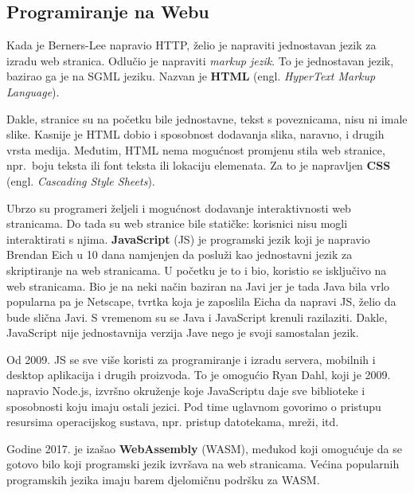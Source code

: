 \subsection{Programiranje na Webu}

Kada je Berners-Lee napravio HTTP, želio je napraviti jednostavan jezik za izradu web stranica.
Odlučio je napraviti \textit{markup jezik}.
To je jednostavan jezik, bazirao ga je na SGML jeziku.
Nazvan je \textbf{HTML} (engl. \textit{HyperText Markup Language}).



Dakle, stranice su na početku bile jednostavne, tekst s poveznicama, nisu ni imale slike.
Kasnije je HTML dobio i sposobnost dodavanja slika, naravno, i drugih vrsta medija.
Međutim, HTML nema mogućnost promjenu stila web stranice, npr.\ boju teksta ili font teksta ili lokaciju elemenata.
Za to je napravljen \textbf{CSS} (engl. \textit{Cascading Style Sheets}).



Ubrzo su programeri željeli i mogućnost dodavanje interaktivnosti web stranicama.
Do tada su web stranice bile statičke: korisnici nisu mogli interaktirati s njima.
\textbf{JavaScript} (JS) je programski jezik koji je napravio Brendan Eich u 10 dana namjenjen da posluži kao jednostavni jezik za skriptiranje na web stranicama.
U početku je to i bio, koristio se isključivo na web stranicama.
Bio je na neki način baziran na Javi jer je tada Java bila vrlo popularna pa je Netscape, tvrtka koja je zaposlila Eicha da napravi JS, želio da bude slična Javi.
S vremenom su se Java i JavaScript krenuli razilaziti.
Dakle, JavaScript nije jednostavnija verzija Jave nego je svoji samostalan jezik.

Od 2009. JS se sve više koristi za programiranje i izradu servera, mobilnih i desktop aplikacija i drugih proizvoda.
To je omogućio Ryan Dahl, koji je 2009. napravio Node.js, izvršno okruženje koje JavaScriptu daje sve biblioteke i sposobnosti koju imaju ostali jezici.
Pod time uglavnom govorimo o pristupu resursima operacijskog sustava, npr. pristup datotekama, mreži, itd.

Godine 2017. je izašao \textbf{WebAssembly} (WASM), međukod koji omogućuje da se gotovo bilo koji programski jezik izvršava na web stranicama.
Većina popularnih programskih jezika imaju barem djelomičnu podršku za WASM.



